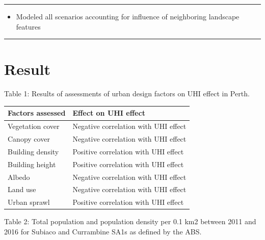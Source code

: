 \documentclass[
  letterpaper,
  DIV=11,
  numbers=noendperiod]{scrreprt}
\providecommand{\tightlist}{%
  \setlength{\itemsep}{0pt}\setlength{\parskip}{0pt}}\usepackage{longtable,booktabs,array}
\begin{document}
\begin{center}\rule{0.5\linewidth}{0.5pt}\end{center}

\begin{itemize}
\tightlist
\item
  Modeled all scenarios accounting for influence of neighboring
  landscape features
\end{itemize}

\begin{center}\rule{0.5\linewidth}{0.5pt}\end{center}

\hypertarget{result}{%
\section{Result}\label{result}}

Table 1: Results of assessments of urban design factors on UHI effect in
Perth.

\begin{longtable}[]{@{}ll@{}}
\toprule()
Factors assessed & Effect on UHI effect \\
\midrule()
\endhead
Vegetation cover & Negative correlation with UHI effect \\
Canopy cover & Negative correlation with UHI effect \\
Building density & Positive correlation with UHI effect \\
Building height & Positive correlation with UHI effect \\
Albedo & Negative correlation with UHI effect \\
Land use & Negative correlation with UHI effect \\
Urban sprawl & Positive correlation with UHI effect \\
\bottomrule()
\end{longtable}

Table 2: Total population and population density per 0.1 km2 between
2011 and 2016 for Subiaco and Currambine SA1s as defined by the ABS.
\end{document}
